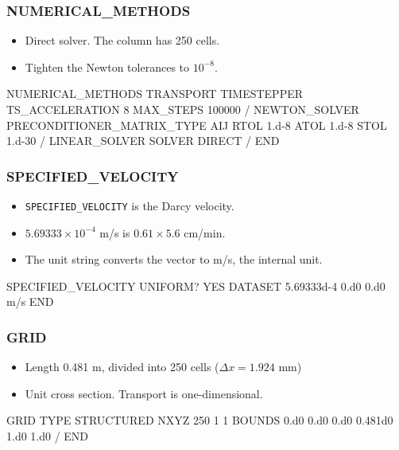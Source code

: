 \documentclass{beamer}
\begin{document}
\begin{frame}[fragile]\frametitle{NUMERICAL\_METHODS}

\begin{itemize}
  \item Direct solver. The column has 250 cells.
  \item Tighten the Newton tolerances to $10^{-8}$.
\end{itemize}

\begin{semiverbatim}
NUMERICAL_METHODS TRANSPORT
  TIMESTEPPER
    TS_ACCELERATION 8
    MAX_STEPS 100000
  /
  NEWTON_SOLVER
    PRECONDITIONER_MATRIX_TYPE AIJ
    RTOL 1.d-8
    ATOL 1.d-8
    STOL 1.d-30
  /
  LINEAR_SOLVER
    SOLVER DIRECT
  /
END
\end{semiverbatim}

\end{frame}

\begin{frame}[fragile]\frametitle{SPECIFIED\_VELOCITY}

\begin{itemize}
  \item \texttt{SPECIFIED\_VELOCITY} is the Darcy velocity.
  \item $5.69333\times 10^{-4}$ m/s is $0.61 \times 5.6$ cm/min.
  \item The unit string converts the vector to m/s, the internal unit.
\end{itemize}

\begin{semiverbatim}
SPECIFIED_VELOCITY
  UNIFORM? YES
  DATASET 5.69333d-4 0.d0 0.d0 m/s
END
\end{semiverbatim}

\end{frame}

\begin{frame}[fragile]\frametitle{GRID}

\begin{itemize}
  \item Length 0.481 m, divided into 250 cells ($\Delta x = 1.924$ mm)
  \item Unit cross section. Transport is one-dimensional.
\end{itemize}

\begin{semiverbatim}
GRID
  TYPE STRUCTURED
  NXYZ 250 1 1
  BOUNDS
    0.d0 0.d0 0.d0
    0.481d0 1.d0 1.d0
  /
END
\end{semiverbatim}

\end{frame}
\end{document}
